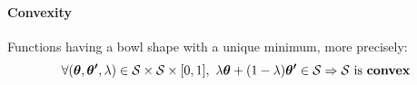\paragraph{Convexity}
Functions having a bowl shape with a unique minimum, more precisely:
$$\forall (\bm{\theta}, \bm{\theta'},\lambda) \in \mathcal{S}\times\mathcal{S}\times[0,1],
~ \lambda\bm{\theta} + (1-\lambda)\bm{\theta'} \in \mathcal{S} \Rightarrow \mathcal{S}
\text{ is \textbf{convex}}$$

